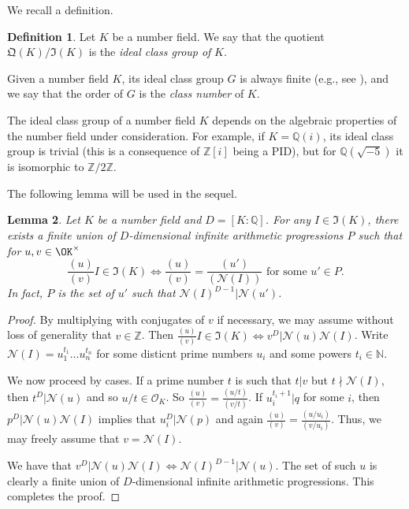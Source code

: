 \documentclass[11pt]{amsart}
\newtheorem{lemma}{Lemma}[section]
\theoremstyle{definition}
\newtheorem{definition}[lemma]{Definition}
\newcommand{\N}{{\mathbb N}}
\newcommand{\NN}{{\mathcal N}}
\newcommand{\Q}{{\mathbb Q}}
\newcommand{\Z}{{\mathbb Z}}
\newcommand{\mf}{\mathfrak}
\begin{document}
We recall a definition.
\begin{definition}
Let $K$ be a number field. %
We say that the quotient $\mf Q(K)/\mf I(K)$ is the \emph{ideal class group of} $K$.
\end{definition}
Given a number field $K$, its ideal class group $G$ is always finite (e.g., see \cite[Theorem~6.3]{neukirch99}), and we say that the order of $G$ is the \emph{class number} of $K$.

The ideal class group of a number field $K$ depends on the algebraic properties of the number field under consideration. For example, if $K=\Q(i)$, its ideal class group is trivial (this is a consequence of $\Z[i]$ being a PID), but for $\Q(\sqrt{-5})$ it is isomorphic to $\Z/2\Z$.

The following lemma will be used in the sequel.
\begin{lemma}\label{cl2}
    Let $K$ be a number field and $D=[K:\Q]$. For any $I\in\mathfrak{I}(K)$, there exists a finite union of $D$-dimensional infinite arithmetic progressions $P$ such that for $u,v\in\OK^{\times}$
$$\frac{(u)}{(v)}I\in\mathfrak{I}(K)\Leftrightarrow \frac{(u)}{(v)}=\frac{(u')}{(\NN(I))} \text{ for some } u'\in P.$$
In fact, $P$ is the set of $u'$ such that $\NN(I)^{D-1}\vert\NN(u')$.
\end{lemma} 
\begin{proof}
By multiplying with conjugates of $v$ if necessary, we may assume without loss of generality that $v\in\Z$. Then $\frac{(u)}{(v)}I\in\mathfrak{I}(K)\Leftrightarrow v^{D}\vert\NN(u)\NN(I)$.
Write $\NN(I)=u_{1}^{t_{1}}\dots u_{n}^{t_{n}}$ for some disticnt prime numbers $u_{i}$ and some powers $t_{i}\in\N$. 

We now proceed by cases. If a prime number $t$ is such that $t\vert v$ but $t\nmid \NN(I)$, then $t^{D}\vert \NN(u)$ and so $u/t\in\mathcal{O}_{K}$. So $\frac{(u)}{(v)}=\frac{(u/t)}{(v/t)}$. If $u_{i}^{t_{i}+1}\vert q$ for some $i$, then $p^{D}\vert\NN(u)\NN(I)$ implies that $u_{i}^{D}\vert \NN(p)$ and again $\frac{(u)}{(v)}=\frac{(u/u_{i})}{(v/u_{i})}$.
Thus, we may freely assume that $v=\NN(I)$.

We have that $v^{D}\vert\NN(u)\NN(I)\Leftrightarrow \NN(I)^{D-1}\vert\NN(u)$. The set of such $u$ is clearly a finite union of $D$-dimensional infinite arithmetic progressions. This completes the proof. 
\end{proof}
\end{document}
